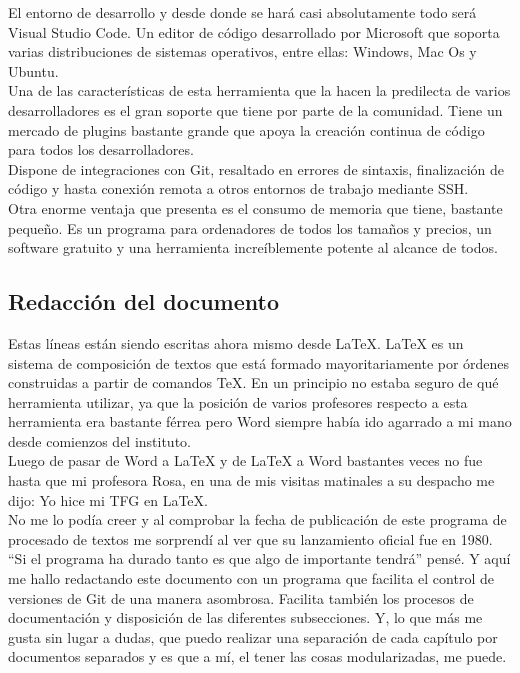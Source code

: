 El entorno de desarrollo y desde donde se hará casi absolutamente todo será Visual Studio Code. Un editor de código desarrollado por Microsoft que soporta varias distribuciones de sistemas operativos, entre ellas: Windows, Mac Os y Ubuntu.
\\Una de las características de esta herramienta que la hacen la predilecta de varios desarrolladores es el gran soporte que tiene por parte de la comunidad. Tiene un mercado de plugins bastante grande que apoya la creación continua de código para todos los desarrolladores.
\\Dispone de integraciones con Git, resaltado en errores de sintaxis, finalización de código y hasta conexión remota a otros entornos de trabajo mediante SSH.
\\Otra enorme ventaja que presenta es el consumo de memoria que tiene, bastante pequeño. Es un programa para ordenadores de todos los tamaños y precios, un software gratuito y una herramienta increíblemente potente al alcance de todos.

\subsection{Redacción del documento}

Estas líneas están siendo escritas ahora mismo desde LaTeX. LaTeX es un sistema de composición de textos que está formado mayoritariamente por órdenes construidas a partir de comandos TeX. En un principio no estaba seguro de qué herramienta utilizar, ya que la posición de varios profesores respecto a esta herramienta era bastante férrea pero Word siempre había ido agarrado a mi mano desde comienzos del instituto.
\\Luego de pasar de Word a LaTeX y de LaTeX a Word bastantes veces no fue hasta que mi profesora Rosa, en una de mis visitas matinales a su despacho me dijo: Yo hice mi TFG en LaTeX.
\\No me lo podía creer y al comprobar la fecha de publicación de este programa de procesado de textos me sorprendí al ver que su lanzamiento oficial fue en 1980. ``Si el programa ha durado tanto es que algo de importante tendrá'' pensé. Y aquí me hallo redactando este documento con un programa que facilita el control de versiones de Git de una manera asombrosa. Facilita también los procesos de documentación y disposición de las diferentes subsecciones. Y, lo que más me gusta sin lugar a dudas, que puedo realizar una separación de cada capítulo por documentos separados y es que a mí, el tener las cosas modularizadas, me puede.

